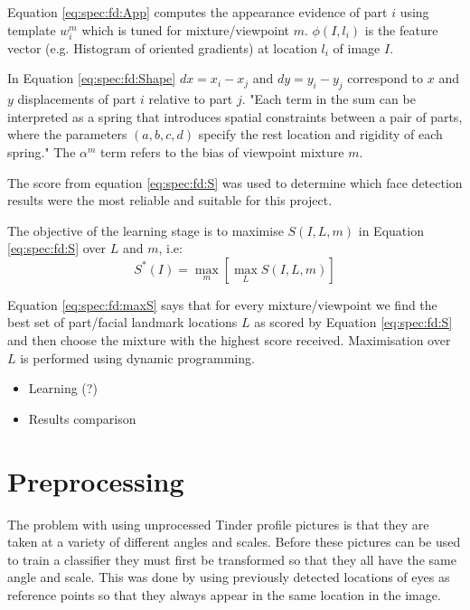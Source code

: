 Equation \ref{eq:spec:fd:App} computes the appearance evidence of part $i$
using template $w_i^m$ which is tuned for mixture/viewpoint $m$. $\phi(I,l_i)$
is the feature vector (e.g. Histogram of oriented gradients) at location $l_i$
of image $I$.

In Equation \ref{eq:spec:fd:Shape} $dx = x_i  - x_j$ and $dy = y_i - y_j$
correspond to $x$ and $y$ displacements of part $i$ relative to part $j$. "Each
term in the sum can be interpreted as a spring that introduces spatial
constraints between a pair of parts, where the parameters $(a,b,c,d)$ specify
the rest location and rigidity of each spring." \citep{zhu2012face}
The $\alpha^m$ term refers to the bias of viewpoint mixture $m$. 

The score from equation \ref{eq:spec:fd:S} was used to determine which face 
detection results were the most reliable and suitable for this project.

The objective of the learning stage is to maximise $S(I,L,m)$ in Equation
\ref{eq:spec:fd:S} over $L$ and $m$, i.e:
\begin{equation}
\label{eq:spec:fd:maxS}
S^*(I) = \max_m[\max_L S(I,L,m)]
\end{equation}

Equation \ref{eq:spec:fd:maxS} says that for every mixture/viewpoint we find
the best set of part/facial landmark locations $L$ as scored by Equation
\ref{eq:spec:fd:S} and then choose the mixture with the highest score received.
Maximisation over $L$ is performed using dynamic programming.

\begin{itemize}
    \item Learning (?)
    \item Results comparison
\end{itemize}


\section{Preprocessing}
\label{spec:preproc}
\newcommand{\vleftright}{\vec{v}_i^{\text{left} \rightarrow \text{right}}}
\newcommand{\vi}[1]{\vec{v}_i^{\text{#1}}}
\newcommand{\vr}[1]{\vec{v}_{\text{ref}}^{\text{#1}}}
\newcommand{\vref}{\vec{v}_{\text{ref}}^{\text{left} \rightarrow \text{right}}}
The problem with using unprocessed Tinder profile pictures is that they are 
taken at a variety of different angles and scales. Before these pictures can 
be used to train a classifier they must first be transformed so that they all 
have the same angle and scale. This was done by using previously detected 
locations of eyes as reference points so that they always appear in the same 
location in the image. 

